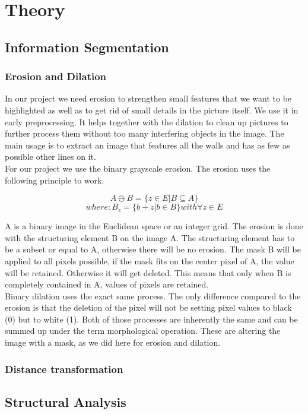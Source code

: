 \section{Theory}
\subsection{Information Segmentation}
\subsubsection{Erosion and Dilation}
In our project we need erosion to strengthen small features that we want to be highlighted as well as to get rid of small details in the picture itself. We use it in early preprocessing. It helps together with the dilation to clean up pictures to further process them without too many interfering objects in the image. The main usage is to extract an image that features all the walls and has as few as possible other lines on it. \cite{burger_burge_2016}
\\
For our project we use the binary grayscale erosion.
The erosion uses the following principle to work.


\[A \ominus B = \{ z\in E | B \subseteq A \}\]  
\[where: B_{z} = \{b+z | b \in B\} with \forall z \in E \]

A is a binary image in the Euclidean space or an integer grid. The erosion is done with the structuring element B on the image A. The structuring element has to be a subset or equal to A, otherwise there will be no erosion. The mask B will be applied to all pixels possible, if the mask fits on the center pixel of A, the value will be retained. Otherwise it will get deleted. This means that only when B is completely contained in A, values of pixels are retained.
\\
Binary dilation uses the exact same process. The only difference compared to the erosion is that the deletion of the pixel will not be setting pixel values to black (0) but to white (1). Both of those processes are inherently the same and can be summed up under the term morphological operation. These are altering the image with a mask, as we did here for erosion and dilation.




\subsubsection{Distance transformation}
\subsection{Structural Analysis}
